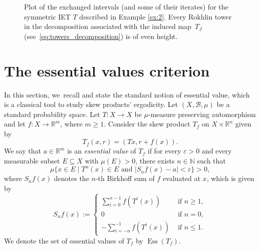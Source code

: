 \documentclass[JEP,XML,SOM,Unicode,NoEqCountersInSection,NoFloatCountersInSection,published]{cedram}
\let\epsilon\varepsilon
\DeclareMathOperator{\Ess}{Ess}
\theoremstyle{plain}
\theoremstyle{definition}
\newcommand{\N}{\mathbb{N}}
\newcommand{\R}{\mathbb{R}}
\begin{document}
\begin{figure}[htb]
\caption{Plot of the exchanged intervals (and some of their iterates) for the symmetric IET $T$ described in Example \ref{ex:2}. Every Rokhlin tower in the decomposition associated with the induced map~$T_J$ (see~\eqref{eq:towers_decomposition}) is of even height.}
\label{}
\end{figure}

\section{The essential values criterion}
In this section, we~recall and state the standard notion of essential value, which is a classical tool to study skew products' ergodicity. Let $(X,\mathcal B, \mu)$ be a standard probability space. Let $T:X\to X$ be $\mu$-measure preserving automorphism and let $f:X\to \R^m$, where $m \geq 1$. Consider the skew product $T_f$ on $X\times \R^n$ given by
\[
T_f(x,r)=(Tx,r+f(x)).
\]
We say that $a\in\R^m$ is an \emph{essential value} of $T_f$ if for every $\epsilon>0$ and every measurable subset $E\subseteq X$ with $\mu(E)>0$, there exists $n\in\N$ such that
\[
\mu\{x\in E\mid T^{n}(x)\in E\text{ and }|S_n f(x)-a|<\epsilon\}>0,
\]
where $S_n f (x)$ denotes the $n$-th Birkhoff sum of $f$ evaluated at $x$, which is given by
\begin{equation}
\label{eq:Birkhoff_sums}
S_n f (x):=\begin{cases}
\sum_{i=0}^{n-1}f(T^{i}(x))& \text{ if }n\ge 1,\\
0&\text{ if }n=0,\\
-\sum_{i=-n}^{-1}f(T^{i}(x))&\text{ if }n\le 1.
\end{cases}
\end{equation}
We denote the set of essential values of $T_f$ by $\Ess(T_f)$.
\end{document}
